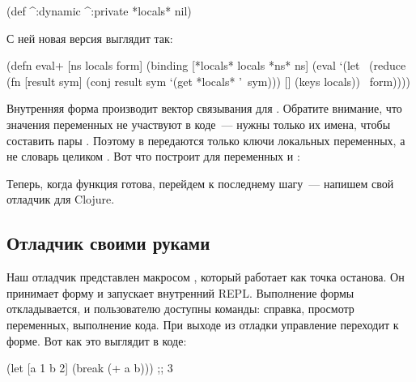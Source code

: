 \begin{english}
  \begin{clojure}
(def ^:dynamic ^:private
  *locals* nil)
  \end{clojure}
\end{english}

С ней новая версия  выглядит так:

\begin{english}
  \begin{clojure/lines}
(defn eval+ [ns locals form]
  (binding [*locals* locals
            *ns* ns]
    (eval
     `(let ~(reduce
             (fn [result sym]
               (conj result sym `(get *locals* '~sym)))
             []
             (keys locals))
        ~form))))
  \end{clojure/lines}
\end{english}

Внутренняя форма   производит вектор связывания для . Обратите внимание, что значения переменных не участвуют в коде~--- нужны только их имена, чтобы составить пары . Поэтому в  передаются только ключи локальных переменных, а не словарь целиком . Вот что построит  для переменных  и :

\begin{english}
  \begin{clojure}
  \end{clojure}
\end{english}

Теперь, когда функция  готова, перейдем к последнему шагу~--- напишем свой отладчик для Clojure.

\subsection{Отладчик своими руками}

\label{section-own-debugger}

Наш отладчик представлен макросом , который работает как точка останова. Он принимает форму и запускает внутренний REPL. Выполнение формы откладывается, и пользователю доступны команды: справка, просмотр переменных, выполнение кода. При выходе из отладки управление переходит к форме. Вот как это выглядит в коде:

\begin{english}
  \begin{clojure}
(let [a 1
      b 2]
  (break (+ a b)))
;; 3
  \end{clojure}
\end{english}

